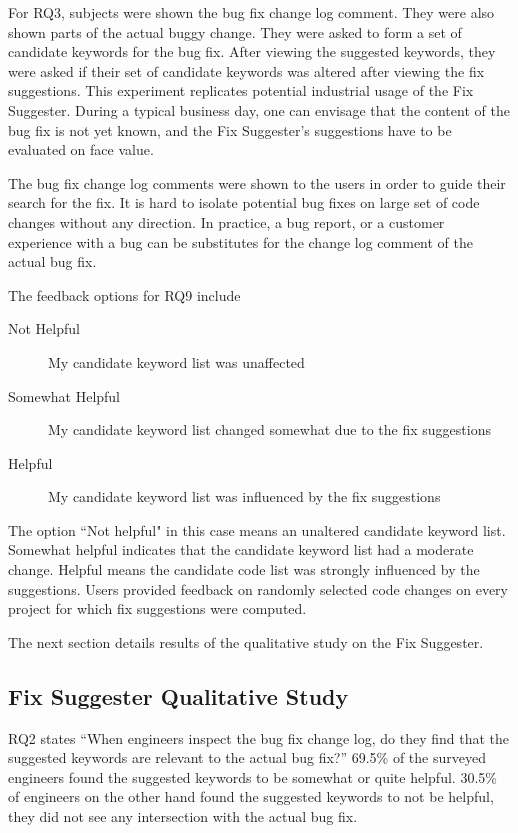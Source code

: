\documentclass[conference]{IEEEtran}
\begin{document}
For RQ3, subjects were shown the bug fix change log comment. They were also shown parts of the actual buggy change. They were asked to form a set of candidate keywords for the bug fix. After viewing the suggested keywords, they were asked if their set of candidate keywords was altered after viewing the fix suggestions. This experiment replicates potential industrial usage of the Fix Suggester. During a typical business day, one can envisage that the content of the bug fix is not yet known, and the Fix Suggester's suggestions have to be evaluated on face value. 

The bug fix change log comments were shown to the users in order to guide their search for the fix. It is hard to isolate potential bug fixes on large set of code changes without any direction. In practice, a bug report, or a customer experience with a bug can be substitutes for the change log comment of the actual bug fix.

The feedback options for RQ9 include

\begin{description}
	\item[Not Helpful] My candidate keyword list was unaffected
	\item[Somewhat Helpful] My candidate keyword list changed somewhat due to the fix suggestions
	\item[Helpful] My candidate keyword list was influenced by the fix suggestions
\end{description}

The option ``Not helpful" in this case means an unaltered candidate keyword list. Somewhat helpful indicates that the candidate keyword list had a moderate change. Helpful means the candidate code list was strongly influenced by the suggestions. Users provided feedback on randomly selected code changes on every project for which fix suggestions were computed.

The next section details results of the qualitative study on the Fix Suggester.

\subsection{Fix Suggester Qualitative Study}
\label{FixSuggesterUserStudy}

RQ2 states ``When engineers inspect the bug fix change log, do they find that the suggested keywords are relevant to the actual bug fix?'' 69.5\% of the surveyed engineers found the suggested keywords to be somewhat or quite helpful. 30.5\% of engineers on the other hand found the suggested keywords to not be helpful, they did not see any intersection with the actual bug fix.
\end{document}

